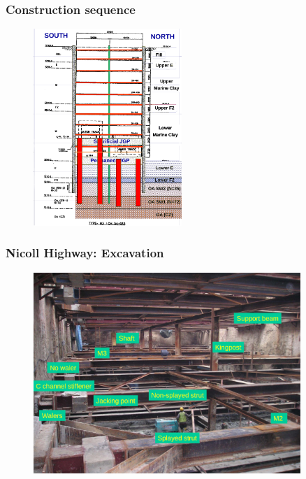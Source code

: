 \documentclass[notes]{beamer}
\begin{document}
\begin{frame}
\frametitle{Construction sequence}
\begin{figure}[ht]
	\centering
	\includegraphics[width=0.5\textwidth]{figs/excavation-stages.png}
\end{figure}
\end{frame}

\begin{frame}
\frametitle{Nicoll Highway: Excavation}
\begin{figure}[ht]
	\centering
	\includegraphics[width=0.9\textwidth]{figs/nicoll-highway-structures.png}
\end{figure}
\end{frame}
\end{document}
